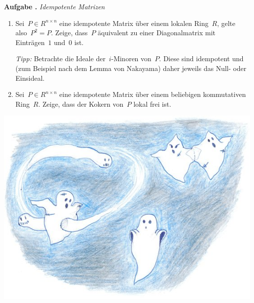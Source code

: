 \documentclass[a4paper,ngerman,12pt]{scrartcl}
\theoremstyle{definition}
\theoremstyle{plain}
\theoremstyle{remark}
\renewcommand{\_}{\mathpunct{.}\,}
\newcommand{\?}{\,{:}\,}
\newlength{\aufgabenskip}
\newcounter{aufgabennummer}
\newenvironment{aufgabe}[1]{
  \addtocounter{aufgabennummer}{1}
  \textbf{Aufgabe \theaufgabennummer{}.} \emph{#1} \par
}{\vspace{\aufgabenskip}}
\newif\ifklein\kleintrue
\begin{document}
\begin{aufgabe}{Idempotente Matrizen}
\begin{enumerate}
\item Sei~$P \in R^{n \times n}$ eine idempotente Matrix über einem lokalen
Ring~$R$, gelte also~$P^2 = P$. Zeige, dass~$P$ äquivalent zu einer
Diagonalmatrix mit Einträgen~$1$ und~$0$ ist.

\emph{Tipp:} Betrachte die Ideale der~$i$-Minoren von~$P$. Diese sind
idempotent und (zum Beispiel nach dem Lemma von Nakayama) daher jeweils das
Null- oder Einsideal.

\item Sei~$P \in R^{n \times n}$ eine idempotente Matrix über einem beliebigen
kommutativen Ring~$R$. Zeige, dass der Kokern von~$P$ lokal frei ist.
\end{enumerate}
\end{aufgabe}

\enlargethispage{2cm}
\thispagestyle{empty}
\vfill
\begin{center}
  \ifklein
    \includegraphics[scale=2.6]{phantome-klein.jpeg}
  \else
    \texttt{[image: phantome]}
  \fi
\end{center}
\end{document}
